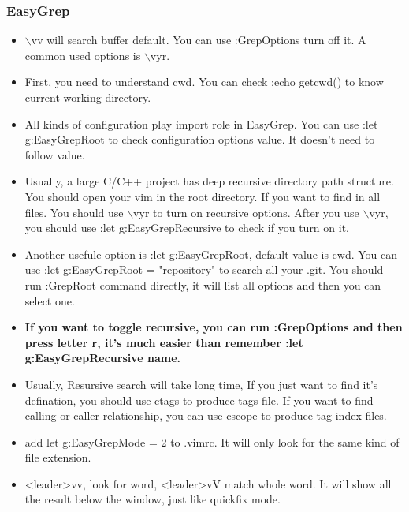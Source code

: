 \documentclass[paper=8.5in:11in, twoside, 12pt, pagesize=pdftex]{book}
\begin{document}
									\subsubsection{EasyGrep}
									\begin{itemize}
										\item $\backslash$vv will search buffer default. You can use :GrepOptions turn off it. A common used options is $\backslash$vyr.
										
										\item First, you need to understand cwd. You can check :echo getcwd() to know current working directory. 
										
										\item All kinds of configuration play import role in EasyGrep. You can use :let g:EasyGrepRoot to check configuration options value. It doesn't need to follow value.
										
										\item Usually, a large C/C++ project has deep recursive directory path structure. You should open your vim in the root directory. If you want to find in all files. You should use $\backslash$vyr to turn on recursive options. After you use $\backslash$vyr, you should use :let g:EasyGrepRecursive to check if you turn on it.
										
										\item Another usefule option is :let g:EasyGrepRoot, default value is cwd. You can use :let g:EasyGrepRoot = "repository" to search all your .git.  You should run :GrepRoot command directly, it will list all options and then you can select one.
										
										\item \textbf{If you want to toggle recursive, you can run :GrepOptions and then press letter r, it's much easier than remember :let g:EasyGrepRecursive name.} 
										
										\item Usually, Resursive search will take long time, If you just want to find it's defination, you should use ctags to produce tags file. If you want to find calling or caller relationship, you can use cscope to produce tag index files. 
										
										\item add let g:EasyGrepMode = 2 to .vimrc. It will only look for the same kind of file extension. 
										
										\item <leader>vv, look for word,  <leader>vV match whole word. It will show all the result below the window, just like quickfix mode.
										

\end{itemize}
\end{document}
